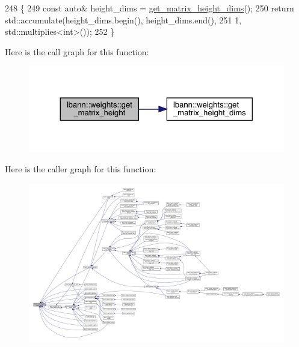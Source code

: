 \begin{DoxyCode}
248                                      \{
249   \textcolor{keyword}{const} \textcolor{keyword}{auto}& height\_dims = \hyperlink{classlbann_1_1weights_a2971f04c57d90fbb09631b1de3dad336}{get\_matrix\_height\_dims}();
250   \textcolor{keywordflow}{return} std::accumulate(height\_dims.begin(), height\_dims.end(),
251                          1, std::multiplies<int>());
252 \}
\end{DoxyCode}
Here is the call graph for this function\+:\nopagebreak
\begin{figure}[H]
\begin{center}
\leavevmode
\includegraphics[width=324pt]{classlbann_1_1weights_ad36676b9b43bced1cc7e332e3745411f_cgraph}
\end{center}
\end{figure}
Here is the caller graph for this function\+:\nopagebreak
\begin{figure}[H]
\begin{center}
\leavevmode
\includegraphics[width=350pt]{classlbann_1_1weights_ad36676b9b43bced1cc7e332e3745411f_icgraph}
\end{center}
\end{figure}
\mbox{\label{classlbann_1_1weights_a2971f04c57d90fbb09631b1de3dad336}} 
